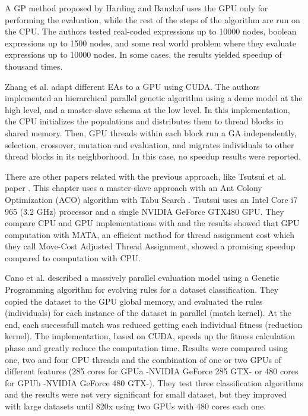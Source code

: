 \documentclass[prodmode,acmtecs]{acmsmall}
\begin{document}
A GP method proposed by Harding and Banzhaf \cite{4215552} uses the GPU only for performing the evaluation, while the rest of the steps of the algorithm are run on the CPU. The authors tested real-coded expressions up to 10000 nodes, boolean expressions up to 1500 nodes, and some real world problem where they evaluate expressions up to 10000 nodes. In some cases, the results yielded speedup of thousand times.

Zhang et al. \cite{ZhangImplementationMasterSlave} adapt different EAs to a GPU using CUDA. The authors implemented an hierarchical parallel genetic algorithm using a deme model at the high level, and a master-slave schema at the low level. In this implementation, the CPU initializes the populations and distributes them to thread blocks in shared memory. Then, GPU threads within each block run a GA independently, selection, crossover, mutation and evaluation, and migrates individuals to other thread blocks in its neighborhood. In this case, no speedup results were reported.

There are other papers related with the previous approach, like Tsutsui et al. paper \cite{Tsutsui:2011:GECCO}. This chapter uses a master-slave approach with an Ant Colony Optimization (ACO) algorithm \cite{Dorigo:1999:ACO:329055_329062} with Tabu Search \cite{Glover:1997:TS:549765}. Tsutsui uses an Intel Core i7 965 (3.2 GHz) processor and a single NVIDIA GeForce GTX480 GPU. They compare CPU and GPU implementations with and the results showed that GPU computation with MATA, an efficient method for thread assignment cost which they call Move-Cost Adjusted Thread Assignment, showed a promising speedup compared to computation with CPU.

Cano et al. \cite{SpeedingTheEvaluationofGPCano:2012} described a massively parallel evaluation model using a Genetic Programming algorithm for evolving rules for a dataset classification. They copied the dataset to the GPU global memory, and evaluated the rules (individuals) for each instance of the dataset in parallel (match kernel). At the end, each successfull match was reduced getting each individual fitness (reduction kernel). The implementation, based on CUDA, speeds up the fitness calculation phase and greatly reduce the computation time. Results were compared using one, two and four CPU threads and the combination of one or two GPUs of different features (285 cores for GPUa -NVIDIA GeForce 285 GTX- or 480 cores for GPUb -NVIDIA GeForce 480 GTX-). They test three classification algorithms and the results were not very significant for small dataset, but they improved with large datasets until 820x using two GPUs with 480 cores each one. %
\end{document}
